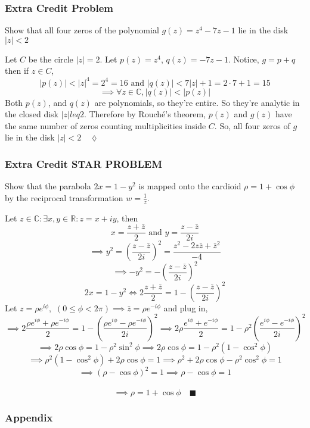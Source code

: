 \documentclass{article}
\newcommand\R{\mathbb{R}}
\newcommand\C{\mathbb{C}}
\begin{document}
\subsubsection*{Extra Credit Problem } Show that all four zeros of the polynomial $g(z) = z^4 - 7z - 1$ lie in the disk $|z| < 2$

Let $C$ be the circle $|z|=2$. Let $p(z) = z^4$, $q(z)=
-7z-1$. Notice, $g = p + q $ then if $z \in C$,
\[|p(z)|< |z|^4 = 2^4 =16 \text{ and }|q(z)| < 7|z|+1 = 2\cdot 7 +1 = 15\]
\[\implies \forall z\in \C, |q(z)|<|p(z)|\]
Both $p(z)$, and $q(z)$ are polynomials, so they're entire. So they're
analytic in the closed disk $|z|leq 2$. Therefore by Rouché's theorem,
$p(z)$ and $g(z)$ have the same number of zeros counting
multiplicities inside $C$. So, all four zeros of $g$ lie in the disk
$|z|<2\quad \lozenge$

\subsubsection*{Extra Credit {\color{orange} STAR PROBLEM}} Show that
the parabola $2x = 1 − y^2$ is mapped onto the cardioid $ρ = 1 + \cos
\phi$ by the reciprocal transformation $w = \frac{1}{z}$.


Let $z\in \C: \exists x,y \in \R: z = x+iy$, then
\[x = \frac{z+\bar{z}}{2}\text{ and }y = \frac{z-\bar{z}}{2i}\]
\[\implies y^2 = \left(\frac{z-\bar{z}}{2i}\right)^2 =
  \frac{z^2-2z\bar{z}+\bar{z}^2}{-4}\]
\[\implies -y^2 = -\left(\frac{z-\bar{z}}{2i}\right)^2\]
\[2x = 1 − y^2 \iff 2\frac{z+\bar{z}}{2} = 1 -\left(\frac{z-\bar{z}}{2i}\right)^2 \]
Let $z = \rho e^{i\phi},\,\, (0\leq \phi < 2\pi)\implies \bar{z} =
\rho e^{-i\phi}$ and plug in,
\[\implies 2\frac{\rho e^{i\phi}+ \rho e^{-i\phi}}{2} = 1 -\left(\frac{\rho
      e^{i\phi}-\rho e^{-i\phi}}{2i}\right)^2 \implies 2\rho\frac{e^{i\phi}+e^{-i\phi}}{2} = 1 -\rho^2\left(\frac{
      e^{i\phi}- e^{-i\phi}}{2i}\right)^2\]
\[\implies 2\rho \cos \phi = 1 -\rho^2\sin^2\phi \implies 2\rho \cos
  \phi = 1 -\rho^2(1-\cos^2 \phi)\]
\[\implies \rho^2(1-\cos^2 \phi) +2\rho\cos
  \phi = 1 \implies \rho^2 +2\rho\cos
  \phi -\rho^2\cos^2 \phi  = 1 \]
\[\implies (\rho-\cos\phi)^2 = 1 \implies \rho-\cos \phi = 1 \]\
\[\implies\rho = 1 + \cos \phi\quad \blacksquare\]
\newpage
\subsubsection*{Appendix}
\end{document}
